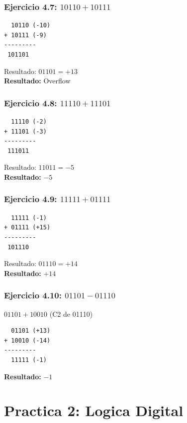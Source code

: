 \documentclass[12pt,a4paper]{article}
\begin{document}
\begin{minipage}[t]{0.48\textwidth}
\subsubsection{Ejercicio 4.7: $10110 + 10111$}
\begin{verbatim}
  10110 (-10)
+ 10111 (-9)
---------
 101101
\end{verbatim}
Resultado: $01101 = +13$\\
\textbf{Resultado:} Overflow
\end{minipage}
\hfill
\begin{minipage}[t]{0.48\textwidth}
\subsubsection{Ejercicio 4.8: $11110 + 11101$}
\begin{verbatim}
  11110 (-2)
+ 11101 (-3)
---------
 111011
\end{verbatim}
Resultado: $11011 = -5$\\
\textbf{Resultado:} $-5$
\end{minipage}

\vspace{0.5cm}

\begin{minipage}[t]{0.48\textwidth}
\subsubsection{Ejercicio 4.9: $11111 + 01111$}
\begin{verbatim}
  11111 (-1)
+ 01111 (+15)
---------
 101110
\end{verbatim}
Resultado: $01110 = +14$\\
\textbf{Resultado:} $+14$
\end{minipage}
\hfill
\begin{minipage}[t]{0.48\textwidth}
\subsubsection{Ejercicio 4.10: $01101 - 01110$}
$01101 + 10010$ (C2 de 01110)
\begin{verbatim}
  01101 (+13)
+ 10010 (-14)
---------
  11111 (-1)
\end{verbatim}
\textbf{Resultado:} $-1$
\end{minipage}


\section{Practica 2: Logica Digital}
\end{document}
